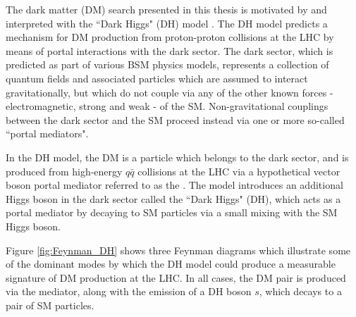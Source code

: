 \label{chapter:dh_model}

The dark matter (DM) search presented in this thesis is motivated by and interpreted with the ``Dark Higgs" (DH) model \cite{Duerr2017}. The DH model predicts a mechanism for DM production from proton-proton collisions at the LHC by means of portal interactions with the dark sector. The dark sector, which is predicted as part of various BSM physics models, represents a collection of quantum fields and associated particles which are assumed to interact gravitationally, but which do not couple via any of the other known forces - electromagnetic, strong and weak - of the SM. Non-gravitational couplings between the dark sector and the SM proceed instead via one or more so-called ``portal mediators". 

In the DH model, the DM is a particle which belongs to the dark sector, and is produced from high-energy \(q\bar{q}\) collisions at the LHC via a hypothetical vector boson portal mediator referred to as the \Zprime. The model introduces an additional Higgs boson in the dark sector called the ``Dark Higgs" (DH), which acts as a portal mediator by decaying to SM particles via a small mixing with the SM Higgs boson. 

Figure \ref{fig:Feynman_DH} shows three Feynman diagrams which illustrate some of the dominant modes by which the DH model could produce a measurable signature of DM production at the LHC. In all cases, the DM pair is produced via the \Zprime mediator, along with the emission of a DH boson \(s\), which decays to a pair of SM particles. 

